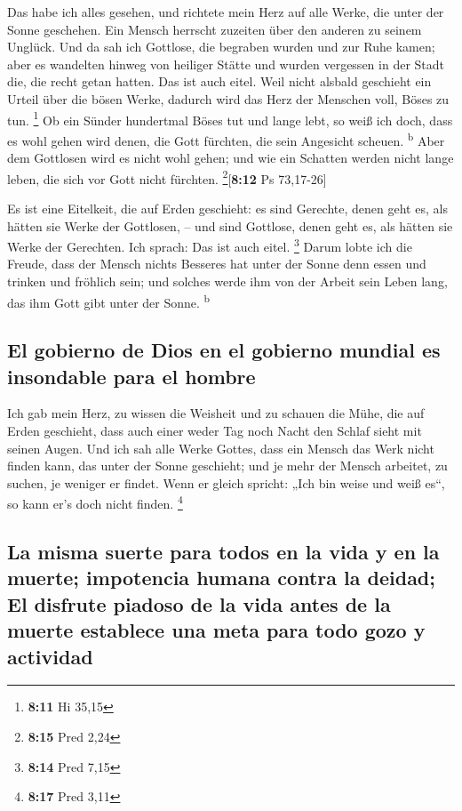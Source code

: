  Das habe ich alles gesehen, und richtete mein Herz auf
alle Werke, die unter der Sonne geschehen. Ein Mensch herrscht zuzeiten
über den anderen zu seinem Unglück.  Und da sah ich
Gottlose, die begraben wurden und zur Ruhe kamen; aber es wandelten
hinweg von heiliger Stätte und wurden vergessen in der Stadt die, die
recht getan hatten. Das ist auch eitel.  Weil nicht
alsbald geschieht ein Urteil über die bösen Werke, dadurch wird das Herz
der Menschen voll, Böses zu tun. \footnote{\textbf{8:11} Hi 35,15}
 Ob ein Sünder hundertmal Böses tut und lange lebt, so
weiß ich doch, dass es wohl gehen wird denen, die Gott fürchten, die
sein Angesicht scheuen. \textsuperscript{b}  Aber dem
Gottlosen wird es nicht wohl gehen; und wie ein Schatten werden nicht
lange leben, die sich vor Gott nicht fürchten.
\footnote{\textbf{8:15} Pred 2,24}{[}\textbf{8:12} Ps 73,17-26{]}

 Es ist eine Eitelkeit, die auf Erden geschieht: es sind
Gerechte, denen geht es, als hätten sie Werke der Gottlosen, -- und sind
Gottlose, denen geht es, als hätten sie Werke der Gerechten. Ich sprach:
Das ist auch eitel. \footnote{\textbf{8:14} Pred 7,15} 
Darum lobte ich die Freude, dass der Mensch nichts Besseres hat unter
der Sonne denn essen und trinken und fröhlich sein; und solches werde
ihm von der Arbeit sein Leben lang, das ihm Gott gibt unter der Sonne.
\textsuperscript{b}

\hypertarget{el-gobierno-de-dios-en-el-gobierno-mundial-es-insondable-para-el-hombre}{%
\subsection{El gobierno de Dios en el gobierno mundial es insondable
para el
hombre}\label{el-gobierno-de-dios-en-el-gobierno-mundial-es-insondable-para-el-hombre}}

 Ich gab mein Herz, zu wissen die Weisheit und zu schauen
die Mühe, die auf Erden geschieht, dass auch einer weder Tag noch Nacht
den Schlaf sieht mit seinen Augen.  Und ich sah alle
Werke Gottes, dass ein Mensch das Werk nicht finden kann, das unter der
Sonne geschieht; und je mehr der Mensch arbeitet, zu suchen, je weniger
er findet. Wenn er gleich spricht: „Ich bin weise und weiß es``, so kann
er's doch nicht finden. \footnote{\textbf{8:17} Pred 3,11}

\hypertarget{la-misma-suerte-para-todos-en-la-vida-y-en-la-muerte-impotencia-humana-contra-la-deidad-el-disfrute-piadoso-de-la-vida-antes-de-la-muerte-establece-una-meta-para-todo-gozo-y-actividad}{%
\subsection{La misma suerte para todos en la vida y en la muerte;
impotencia humana contra la deidad; El disfrute piadoso de la vida antes
de la muerte establece una meta para todo gozo y
actividad}\label{la-misma-suerte-para-todos-en-la-vida-y-en-la-muerte-impotencia-humana-contra-la-deidad-el-disfrute-piadoso-de-la-vida-antes-de-la-muerte-establece-una-meta-para-todo-gozo-y-actividad}}

